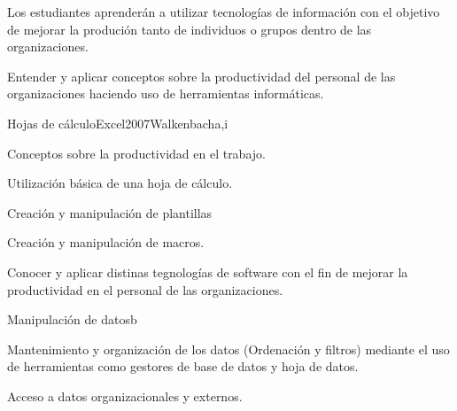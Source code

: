 \begin{syllabus}


\begin{justification}
Los estudiantes aprenderán a utilizar tecnologías de información con el objetivo de mejorar
la produción tanto de individuos o grupos dentro de las organizaciones.
\end{justification}

\begin{goals}
\item Entender y aplicar conceptos  sobre la productividad del personal de las organizaciones haciendo uso de herramientas informáticas.
\end{goals}

\begin{outcomes}
\end{outcomes}

\begin{unit}{Hojas de cálculo}{Excel2007Walkenbach}{a,i}
   \begin{topics}
      \item Conceptos sobre la productividad en el trabajo.
      \item Utilización básica de una hoja de cálculo.
      \item Creación y manipulación de plantillas
      \item Creación y manipulación de macros.
   \end{topics}

   \begin{learningoutcomes}
      \item Conocer y aplicar distinas  tegnologías  de software con el fin de mejorar la productividad en el personal de las organizaciones.
   \end{learningoutcomes}
\end{unit}

\begin{unit}{Manipulación de datos}{}{b}
   \begin{topics}
      \item Mantenimiento y organización de los datos (Ordenación y filtros) mediante el uso de herramientas como gestores de base de datos y hoja de datos.
      \item Acceso a datos organizacionales y externos.
   \end{topics}


\end{unit}
\end{syllabus}
